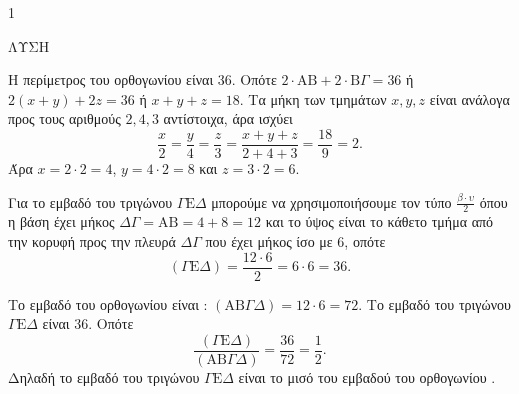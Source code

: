 \begin{ylh}{1}
    \item [Ύλη από εικόνα]
\end{ylh}

ΛΥΣΗ

\begin{figure} %
    \centering
\end{figure}

\begin{alist}
\item Η περίμετρος του ορθογωνίου \Gamma\Delta είναι $36$. Οπότε $2 \cdot \text{AB} + 2 \cdot \text{B}\Gamma = 36$ ή $2 (x + y) + 2 z = 36$ ή $x + y + z = 18$. Τα μήκη των τμημάτων $x, y, z$ είναι ανάλογα προς τους αριθμούς $2,4,3$ αντίστοιχα, άρα ισχύει
\[
\frac{x}{2} = \frac{y}{4} = \frac{z}{3} = \frac{x+y+z}{2+4+3} = \frac{18}{9} = 2.
\]
Άρα $x = 2 \cdot 2 = 4$, $y = 4 \cdot 2 = 8$ και $z = 3 \cdot 2 = 6$.
\item
    \begin{rlist}
    \item Για το εμβαδό του τριγώνου $\Gamma\text{E}\Delta$ μπορούμε να χρησιμοποιήσουμε τον τύπο $\frac{\beta \cdot \upsilon}{2}$ όπου η βάση έχει μήκος $\Delta\Gamma = \text{AB} = 4+8=12$ και το ύψος είναι το κάθετο τμήμα από την κορυφή  προς την πλευρά $\Delta\Gamma$ που έχει μήκος ίσο με $6$, οπότε
    \[
    (\Gamma\text{E}\Delta) = \frac{12 \cdot 6}{2} = 6 \cdot 6 = 36.
    \]
    \item Το εμβαδό του ορθογωνίου \Gamma\Delta είναι : $(\text{A}\text{B}\Gamma\Delta) = 12 \cdot 6 = 72$. Το εμβαδό του τριγώνου $\Gamma\text{E}\Delta$ είναι $36$. Οπότε
    \[
    \frac{(\Gamma\text{E}\Delta)}{(\text{A}\text{B}\Gamma\Delta)} = \frac{36}{72} = \frac{1}{2}.
    \]
    Δηλαδή το εμβαδό του τριγώνου $\Gamma\text{E}\Delta$ είναι το μισό του εμβαδού του ορθογωνίου \Gamma\Delta.
    \end{rlist}
\end{alist}